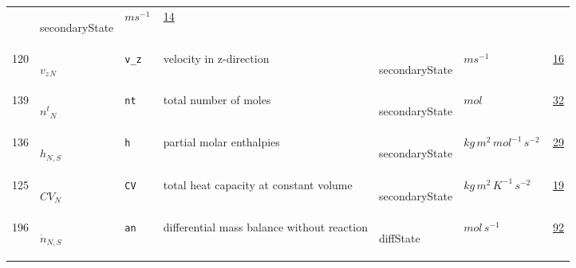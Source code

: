 \begin{longtable}{|p{1cm}|p{2.5cm}|p{4.5cm}|p{8cm}|p{3.0cm}|p{3cm}|p{1cm}|}
             & \begin{lay}secondaryState \end{lay}
             & $ m s^{-1} \, $
             &                 \hyperlink{"e:14"}{ 14 }
                 \\
            120
             & \hypertarget{"v:120"}{ $ {{v_z}}{_{N}} $}
             & \verb|v_z|
             & velocity in z-direction
             & \begin{lay}secondaryState \end{lay}
             & $ m s^{-1} \, $
             &                 \hyperlink{"e:16"}{ 16 }
                 \\
            139
             & \hypertarget{"v:139"}{ $ {{n^t}}{_{N}} $}
             & \verb|nt|
             & total number of moles
             & \begin{lay}secondaryState \end{lay}
             & $ mol \, $
             &                 \hyperlink{"e:32"}{ 32 }
                 \\
            136
             & \hypertarget{"v:136"}{ $ {h}{_{N, S}} $}
             & \verb|h|
             & partial molar enthalpies
             & \begin{lay}secondaryState \end{lay}
             & $ kg \,m^{2} \,mol^{-1} \,s^{-2} \, $
             &                 \hyperlink{"e:29"}{ 29 }
                 \\
            125
             & \hypertarget{"v:125"}{ $ {CV}{_{N}} $}
             & \verb|CV|
             & total heat capacity at constant volume
             & \begin{lay}secondaryState \end{lay}
             & $ kg \,m^{2} \,K^{-1} \,s^{-2} \, $
             &                 \hyperlink{"e:19"}{ 19 }
                 \\
            196
             & \hypertarget{"v:196"}{ $ {{\dot{n}}}{_{N, S}} $}
             & \verb|an|
             & differential mass balance without reaction
             & \begin{lay}diffState \end{lay}
             & $ mol \,s^{-1} \, $
             &                 \hyperlink{"e:92"}{ 92 }
                 \\
    \end{longtable}